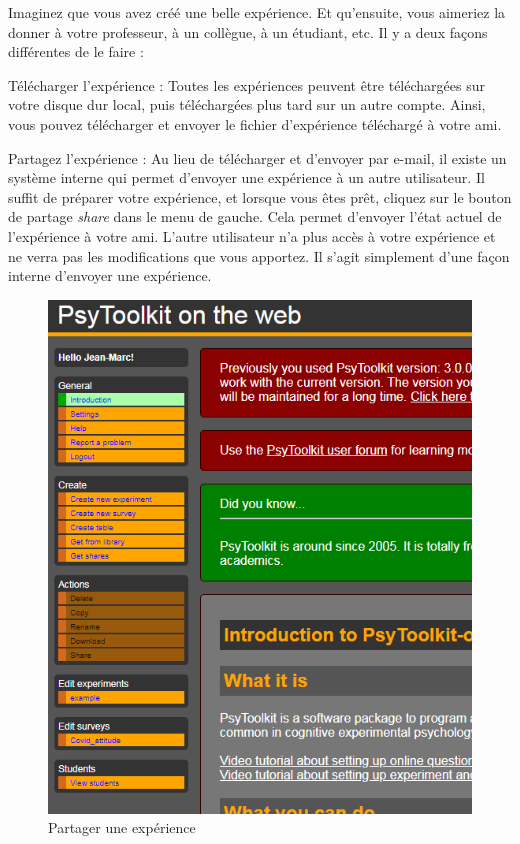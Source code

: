 \documentclass[
]{book}
\begin{document}
Imaginez que vous avez créé une belle expérience. Et qu'ensuite, vous aimeriez la donner à votre professeur, à un collègue, à un étudiant, etc. Il y a deux façons différentes de le faire :

Télécharger l'expérience : Toutes les expériences peuvent être téléchargées sur votre disque dur local, puis téléchargées plus tard sur un autre compte. Ainsi, vous pouvez télécharger et envoyer le fichier d'expérience téléchargé à votre ami.

Partagez l'expérience : Au lieu de télécharger et d'envoyer par e-mail, il existe un système interne qui permet d'envoyer une expérience à un autre utilisateur. Il suffit de préparer votre expérience, et lorsque vous êtes prêt, cliquez sur le bouton de partage \emph{share} dans le menu de gauche. Cela permet d'envoyer l'état actuel de l'expérience à votre ami. L'autre utilisateur n'a plus accès à votre expérience et ne verra pas les modifications que vous apportez. Il s'agit simplement d'une façon interne d'envoyer une expérience.

\begin{figure}
\centering
\includegraphics{img/share_experiment.PNG}
\caption{Partager une expérience}
\end{figure}
\end{document}
